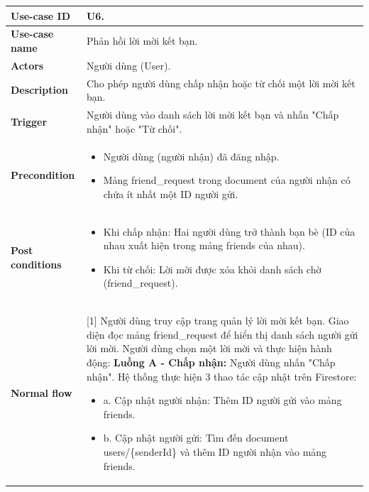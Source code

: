 \documentclass[a4paper, 12pt]{article}
\begin{document}
\begin{longtable}{|p{3.5cm}|p{12cm}|}
	\hline
	\textbf{Use-case ID} & U6. \\
	\hline
	\textbf{Use-case name} & Phản hồi lời mời kết bạn. \\
	\hline
	\textbf{Actors} & Người dùng (User). \\
	\hline
	\textbf{Description} & Cho phép người dùng chấp nhận hoặc từ chối một lời mời kết bạn. \\
	\hline
	\textbf{Trigger} & Người dùng vào danh sách lời mời kết bạn và nhấn "Chấp nhận" hoặc "Từ chối". \\
	\hline
	\textbf{Precondition} & 
	\begin{itemize}[nosep, leftmargin=*, label=+]
		\item Người dùng (người nhận) đã đăng nhập.
		\item Mảng friend\_request trong document của người nhận có chứa ít nhất một ID người gửi.
	\end{itemize} \\
	\hline
	\textbf{Post conditions} & 
	\begin{itemize}[nosep, leftmargin=*, label={-}]
		\item Khi chấp nhận: Hai người dùng trở thành bạn bè (ID của nhau xuất hiện trong mảng friends của nhau).
		\item Khi từ chối: Lời mời được xóa khỏi danh sách chờ (friend\_request).
	\end{itemize} \\
	\hline
	\textbf{Normal flow} & 
	[1] Người dùng truy cập trang quản lý lời mời kết bạn. \newline
	[2] Giao diện đọc mảng friend\_request để hiển thị danh sách người gửi lời mời. \newline
	[3] Người dùng chọn một lời mời và thực hiện hành động: \newline
	\textbf{Luồng A - Chấp nhận:} \newline
	[A1] Người dùng nhấn "Chấp nhận". \newline
	[A2] Hệ thống thực hiện 3 thao tác cập nhật trên Firestore:
	\begin{itemize}[nosep, leftmargin=0.5cm, label={}]
		\item a. Cập nhật người nhận: Thêm ID người gửi vào mảng friends.
		\item b. Cập nhật người gửi: Tìm đến document users/\{senderId\} và thêm ID người nhận vào mảng friends.

\end{itemize}
\end{longtable}
\end{document}
